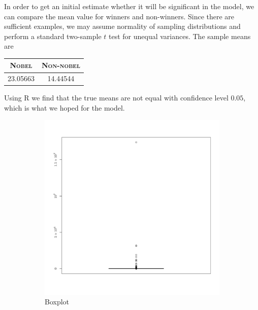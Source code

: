 In order to get an initial estimate whether it will be significant in the model, we can compare the mean value for winners and non-winners. Since there are sufficient examples, we may assume normality of sampling distributions and perform a standard two-sample $t$ test for unequal variances. The sample means are 
\begin{table}[H]
\centering
\begin{tabular}{c|c}
\textbf{\textsc{Nobel}} & \textbf{\textsc{Non-nobel}} \\ \hline
\rule{0pt}{4mm}23.05663&14.44544\\
\end{tabular}
\end{table} 
\noindent Using R we find that the true means are not equal with confidence level $0.05$, which is what we hoped for the model.
\begin{figure}
    \centering
    \begin{subfigure}[b]{0.3\textwidth}
        \includegraphics[width=\textwidth]{figures/popuInitialBox.pdf}
        \caption{Boxplot}
        \label{fig:popuInitialBox}
    \end{subfigure}
    \quad
    \begin{subfigure}[b]{0.3\textwidth}

\end{subfigure}
\end{figure}
